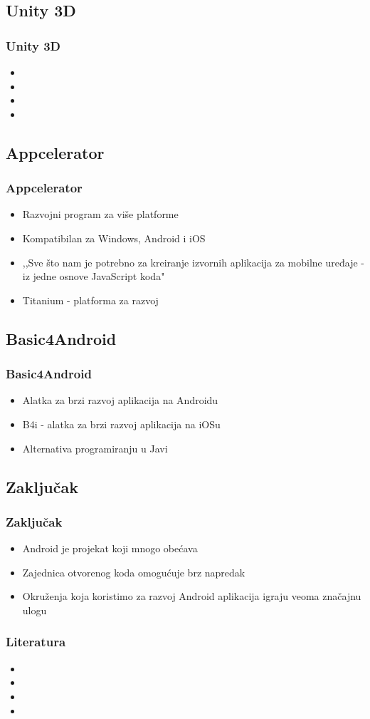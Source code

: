 \documentclass{beamer}
\begin{document}
\begin{frame}
    \section{Unity 3D}
    \frametitle{Unity 3D} 
    \begin{itemize}
	\item
	\item 
	\item 
	\item  
   \end{itemize}
\end{frame}

\begin{frame}
    \section{Appcelerator}
    \frametitle{Appcelerator} 
    \begin{itemize}
    	\item Razvojni program za više platforme
	\item Kompatibilan za Windows, Android i iOS
	\item ,,Sve što nam je potrebno za kreiranje izvornih aplikacija za mobilne uređaje - iz jedne osnove JavaScript koda"
	\item  Titanium - platforma za razvoj
   \end{itemize}
\end{frame}

\begin{frame}
    \section{Basic4Android}
    \frametitle{Basic4Android} 
    \begin{itemize}
	\item Alatka za brzi razvoj aplikacija na Androidu
	\item B4i - alatka za brzi razvoj aplikacija na iOSu
	\item Alternativa programiranju u Javi
   \end{itemize}
\end{frame}

\begin{frame}
    \section{Zaključak}
    \frametitle{Zaključak} 
    \begin{itemize}
	\item Android je projekat koji mnogo obećava
	\item Zajednica otvorenog koda omogućuje brz napredak
	\item Okruženja koja koristimo za razvoj Android aplikacija igraju veoma značajnu ulogu
	
   \end{itemize}
\end{frame}

\begin{frame}
    \frametitle{Literatura}
    \begin{itemize}
	\item
	\item 
	\item 
	\item  
   \end{itemize}
\end{frame}
\end{document}
